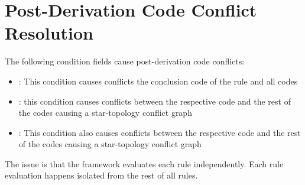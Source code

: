 \section{Post-Derivation Code Conflict Resolution}

The following condition fields cause post-derivation code conflicts:
\begin{itemize}
    \item {}: This condition causes conflicts the conclusion code of the rule and all codes
    \item {}: this condition causes conflicts between the respective code and the rest of the codes causing a star-topology conflict graph
    \item {}: This condition also causes conflicts between the respective code and the rest of the codes causing a star-topology conflict graph
\end{itemize}

The issue is that the framework evaluates each rule independently.
Each rule evaluation happens isolated from the rest of all rules.


